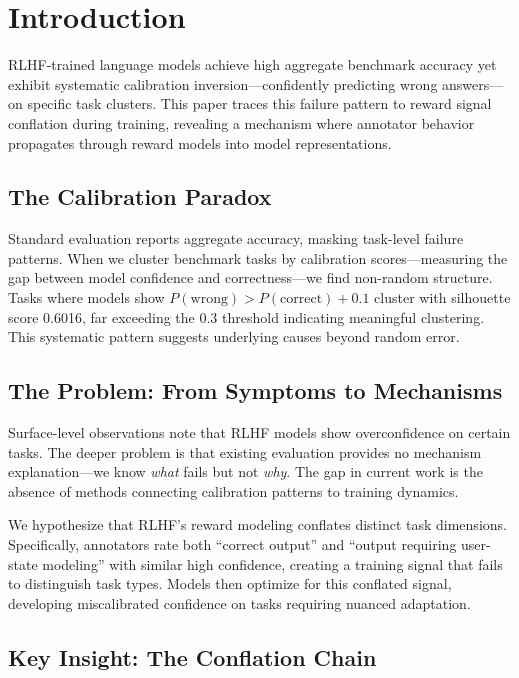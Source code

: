 \section{Introduction}

RLHF-trained language models achieve high aggregate benchmark accuracy yet exhibit systematic calibration inversion---confidently predicting wrong answers---on specific task clusters. This paper traces this failure pattern to reward signal conflation during training, revealing a mechanism where annotator behavior propagates through reward models into model representations.

\subsection{The Calibration Paradox}

Standard evaluation reports aggregate accuracy, masking task-level failure patterns. When we cluster benchmark tasks by calibration scores---measuring the gap between model confidence and correctness---we find non-random structure. Tasks where models show $P(\text{wrong}) > P(\text{correct}) + 0.1$ cluster with silhouette score 0.6016, far exceeding the 0.3 threshold indicating meaningful clustering. This systematic pattern suggests underlying causes beyond random error.

\subsection{The Problem: From Symptoms to Mechanisms}

Surface-level observations note that RLHF models show overconfidence on certain tasks. The deeper problem is that existing evaluation provides no mechanism explanation---we know \emph{what} fails but not \emph{why}. The gap in current work is the absence of methods connecting calibration patterns to training dynamics.

We hypothesize that RLHF's reward modeling conflates distinct task dimensions. Specifically, annotators rate both ``correct output'' and ``output requiring user-state modeling'' with similar high confidence, creating a training signal that fails to distinguish task types. Models then optimize for this conflated signal, developing miscalibrated confidence on tasks requiring nuanced adaptation.

\subsection{Key Insight: The Conflation Chain}

